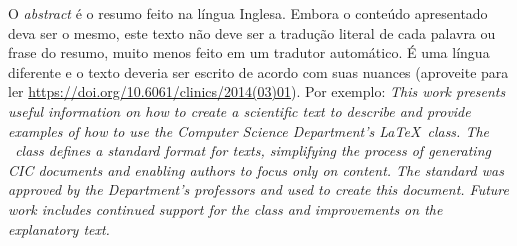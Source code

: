 O \emph{abstract} é o resumo feito na língua Inglesa. Embora o conteúdo apresentado
deva ser o mesmo, este texto não deve ser a tradução literal de cada palavra ou
frase do resumo, muito menos feito em um tradutor automático. É uma língua
diferente e o texto deveria ser escrito de acordo com suas nuances (aproveite para ler
\url{https://doi.org/10.6061/clinics/2014(03)01}). Por exemplo: \emph{This work presents useful information on how to create a scientific text to describe
and provide examples of how to use the Computer Science Department's \LaTeX\ class. The \unbcic\
class defines a standard format for texts, simplifying the process of generating
CIC documents and enabling authors to focus only on content. The standard was approved
by the Department's professors and used to create this document. Future work includes
continued support for the class and improvements on the explanatory text.}